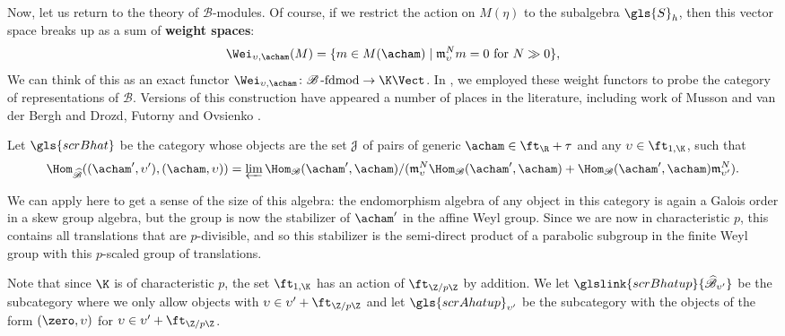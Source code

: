 Now, let us return to the theory of $\mathscr{B}$-modules. Of course, if we restrict the action on $M(\eta)$ to the subalgebra
$\gls{S}_h$, then this vector space breaks up as a sum of {\bf weight spaces}:
\begin{equation}
  \label{eq:W-def}
  \Wei_{\upsilon,\acham}(M)=\{m\in M(\acham)\mid \mathfrak{m}_{\upsilon}^Nm=0 \text{ for } N\gg 0\},
\end{equation} 
We can think of this as an exact functor
$\Wei_{\upsilon,\acham}\colon \mathscr{B}\operatorname{-fdmod}\to \K\Vect$.
In \cite{WebSD}, we employed these weight functors to probe the
category of representations of  $\mathscr{B}$.   Versions of this
construction have appeared a number of places in the literature,
including work of Musson and van der Bergh \cite{MVdB} and Drozd,
Futorny and Ovsienko \cite{FOD}.
\begin{definition}
  Let $\gls{scrBhat}$ be the category whose objects are the
  set $\EuScript{J}$ of pairs of generic $\acham\in \ft_\R+\tau$ and any
  $\upsilon\in \ft_{1,\K}$, such that
  \[\Hom_{\widehat{\mathscr{B}}}((\acham',\upsilon'),(\acham,\upsilon))=\varprojlim
  \Hom_{{\mathscr{B}}}(\acham',\acham)/(\mathfrak{m}_{\upsilon}^N
  \Hom_{{\mathscr{B}}}(\acham',\acham)+\Hom_{{\mathscr{B}}}(\acham',\acham)\mathfrak{m}_{\upsilon'}^N).\] 
\end{definition}
We can apply \cite[Theorem B]{WebGT} here to get a sense of the size
of this algebra: the endomorphism algebra
of any object in this category is again a Galois order in a skew group
algebra, but the group is now the stabilizer of $\acham'$ in the
affine Weyl group. Since we are now in characteristic $p$, this
contains all translations that are $p$-divisible, and so this
stabilizer is the semi-direct product of a parabolic subgroup in the
finite Weyl group with this $p$-scaled group of translations.  


Note that since $\K$ is of characteristic $p$, the set $\ft_{1,\K}$
has an action of $\ft_{\Z/p\Z}$ by addition.
We let $\glslink{scrBhatup}{\mathscr{\widehat{B}}_{\upsilon'}}$ be the subcategory where we only
allow objects  with $\upsilon\in \upsilon'+\ft_{\Z/p\Z}$ and let
$\gls{scrAhatup}_{\upsilon'}$ be the subcategory with the objects of the form
$(\zero,\upsilon)$ for $\upsilon \in \upsilon'+\ft_{\Z/p\Z}$.  

